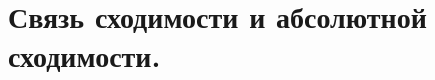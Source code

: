 \documentclass[../main.tex]{subfiles}
\begin{document}
\newpage
\section{Связь сходимости и абсолютной сходимости.}
\end{document}
